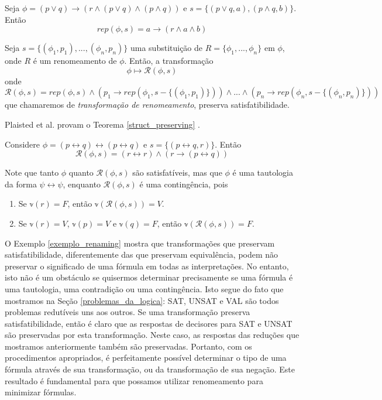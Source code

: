 \begin{example}
	Seja $\phi = (p \vee q) \rightarrow (r \wedge (p \vee q) \wedge (p \wedge q))$ e $s = \{(p \vee q,a),(p \wedge q,b)\}$. Então $$rep(\phi,s) = a \rightarrow (r \wedge a \wedge b)$$
\end{example}

\begin{theorem}
	\label{struct_preserving}
	Seja $s = \{(\phi_1,p_1),...,(\phi_n,p_n) \}$ uma substituição de $R = \{\phi_1,...,\phi_n \}$ em $\phi$, onde $R$ é um renomeamento de $\phi$. Então, a transformação $$\phi \longmapsto \mathcal{R}(\phi,s)$$ onde $$\mathcal{R}(\phi,s) = rep(\phi,s) \wedge (p_1 \rightarrow rep(\phi_1,s-\{(\phi_1,p_1)\})) \wedge ... \wedge (p_n \rightarrow rep(\phi_n,s-\{(\phi_n,p_n)\}))$$
    que chamaremos de \emph{transformação de renomeamento}, preserva satisfatibilidade.
\end{theorem}

Plaisted et al. provam o Teorema \ref{struct_preserving} \cite{plaisted1986structure}.

\begin{example}
	\label{exemplo_renaming}
    Considere $\phi = (p \leftrightarrow q) \leftrightarrow (p \leftrightarrow q)$ e $s = \{(p \leftrightarrow q, r) \}$. Então $$\mathcal{R}(\phi,s) = (r \leftrightarrow r) \wedge (r \rightarrow (p \leftrightarrow q))$$
    
    Note que tanto $\phi$ quanto $\mathcal{R}(\phi,s)$ são satisfatíveis, mas que $\phi$ é uma tautologia da forma $\psi \leftrightarrow \psi$, enquanto $\mathcal{R}(\phi,s)$ é uma contingência, pois
    \begin{enumerate}
    	\item Se $\mathbb{v}(r) = F$, então $\mathbb{v}(\mathcal{R}(\phi,s)) = V$.
    	\item Se $\mathbb{v}(r) = V$, $\mathbb{v}(p) = V$ e $\mathbb{v}(q) = F$, então $\mathbb{v}(\mathcal{R}(\phi,s)) = F$.
    \end{enumerate}
\end{example}

O Exemplo \ref{exemplo_renaming} mostra que transformações que preservam satisfatibilidade, diferentemente das que preservam equivalência, podem não preservar o significado de uma fórmula em todas as interpretações. No entanto, isto não é um obstáculo se quisermos determinar precisamente se uma fórmula é uma tautologia, uma contradição ou uma contingência. Isto segue do fato que mostramos na Seção \ref{problemas_da_logica}: SAT, UNSAT e VAL são todos problemas redutíveis uns aos outros. Se uma transformação preserva satisfatibilidade, então é claro que as respostas de decisores para SAT e UNSAT são preservadas por esta transformação. Neste caso, as respostas das reduções que mostramos anteriormente também são preservadas. Portanto, com os procedimentos apropriados, é perfeitamente possível determinar o tipo de uma fórmula através de sua transformação, ou da transformação de sua negação. Este resultado é fundamental para que possamos utilizar renomeamento para minimizar fórmulas.

